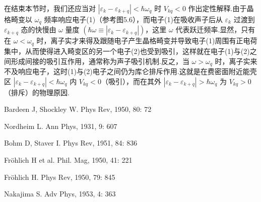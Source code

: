 在结束本节时，我们还应当对 $\left|\varepsilon_k-\varepsilon_{k+q}\right|<\hbar\omega_q$ 时 $V_{kq}<0$ 作出定性解释.由于晶格畸变以 $\omega_q$ 频率响应电子(1)（参考图5.6），而电子(1)在吸收声子后从 $\varepsilon_k$ 过渡到 $\varepsilon_{k+q}$ 态的快慢由 $\omega$ 量度 $\left(\hbar\omega\equiv\left|\varepsilon_k-\varepsilon_{k+q}\right|\right)$，这里 $\omega$ 代表跃迁频率.显然，只有在 $\omega<\omega_q$ 时，离子实才来得及跟随电子产生晶格畸变并导致电子(1)周围有正电荷集中，从而使得进入畸变区的另一个电子(2)也受到吸引，这样就在电子(1)与(2)之间形成间接的吸引互作用，通常称为声子吸引机制.反之，当 $\omega>\omega_q$ 时，离子实来不及响应电子，这时(1)与(2)电子之间仍为库仑排斥作用.这就是在费密面附近能壳区 $\left|\varepsilon_k-\varepsilon_{k+q}\right|<\hbar\omega_q$ 内 $V_{kq}<0$（吸引），而在其外 $\left|\varepsilon_k-\varepsilon_{k+q}\right|>\hbar\omega_q$ 为 $V_{kq}>0$（排斥）的物理原因.

\begin{canKao}
\begin{enumerate}[label={[\arabic*]}, leftmargin=2.2em, itemsep=0pt]
\item Bardeen J, Shockley W. Phys Rev, 1950, 80: 72
\item Nordheim L. Ann Phys, 1931, 9: 607
\item Bohm D, Staver I. Phys Rev, 1951, 84: 836
\item Fr\"{o}hlich H et al. Phil. Mag, 1950, 41: 221
\item Fr\"{o}hlich H. Phys Rev, 1950, 79: 845
\item Nakajima S. Adv Phys, 1953, 4: 363
\end{enumerate}
\end{canKao}
